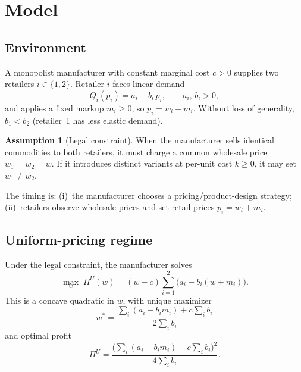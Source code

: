\documentclass[11pt,a4paper]{article}
\theoremstyle{plain}
\theoremstyle{definition}
\newtheorem{assumption}[theorem]{Assumption}
\theoremstyle{remark}
\begin{document}
\section{Model}\label{sec:model}

\subsection{Environment}

A monopolist manufacturer with constant marginal cost $c>0$ supplies two retailers $i\in\{1,2\}$.
Retailer $i$ faces linear demand
\begin{equation}\label{eq:demand}
  Q_i(p_i) = a_i - b_i\,p_i, \qquad a_i,\,b_i > 0,
\end{equation}
and applies a fixed markup $m_i\ge 0$, so $p_i = w_i + m_i$.
Without loss of generality, $b_1 < b_2$ (retailer~1 has less elastic demand).

\begin{assumption}[Legal constraint]\label{ass:rpa}
When the manufacturer sells identical commodities to both retailers, it must charge a common wholesale price $w_1=w_2=w$.
If it introduces distinct variants at per-unit cost $k\ge 0$, it may set $w_1\ne w_2$.
\end{assumption}

The timing is: (i)~the manufacturer chooses a pricing/product-design strategy; (ii)~retailers observe wholesale prices and set retail prices $p_i = w_i + m_i$.

\subsection{Uniform-pricing regime}\label{sec:uniform}

Under the legal constraint, the manufacturer solves
\begin{equation}\label{eq:pi_u_fn}
  \max_{w}\; \Pi^U(w) = (w-c)\sum_{i=1}^{2}\bigl(a_i - b_i(w+m_i)\bigr).
\end{equation}
This is a concave quadratic in $w$, with unique maximizer
\begin{equation}\label{eq:wstar}
  w^* = \frac{\sum_i(a_i - b_i m_i) + c\sum_i b_i}{2\sum_i b_i}
\end{equation}
and optimal profit
\begin{equation}\label{eq:pi_u}
  \Pi^U = \frac{\bigl(\sum_i(a_i - b_i m_i) - c\sum_i b_i\bigr)^2}{4\sum_i b_i}.
\end{equation}
\end{document}
